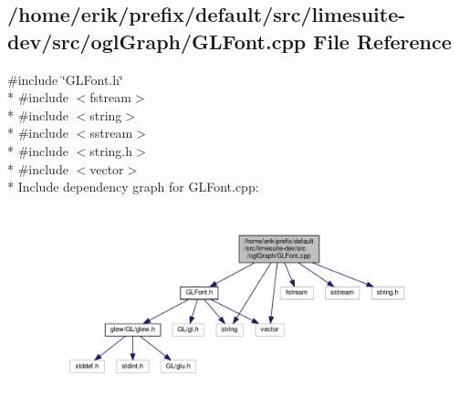 \subsection{/home/erik/prefix/default/src/limesuite-\/dev/src/ogl\+Graph/\+G\+L\+Font.cpp File Reference}
\label{GLFont_8cpp}
{\ttfamily \#include \char`\"{}G\+L\+Font.\+h\char`\"{}}\\*
{\ttfamily \#include $<$fstream$>$}\\*
{\ttfamily \#include $<$string$>$}\\*
{\ttfamily \#include $<$sstream$>$}\\*
{\ttfamily \#include $<$string.\+h$>$}\\*
{\ttfamily \#include $<$vector$>$}\\*
Include dependency graph for G\+L\+Font.\+cpp\+:
\nopagebreak
\begin{figure}[H]
\begin{center}
\leavevmode
\includegraphics[width=350pt]{d7/d69/GLFont_8cpp__incl}
\end{center}
\end{figure}
